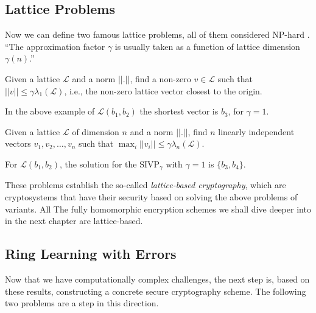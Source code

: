\subsection{Lattice Problems}
Now we can define two famous lattice problems, all of them considered NP-hard \cite{hardnes}. ``The approximation factor $\gamma$ is usually taken as a function of lattice dimension $\gamma(n)$.'' \cite{ppt_dm}

\begin{definition}\label{def:svp} Given a lattice $\mathcal L$ and a norm $||.||$, find a non-zero $v\in\mathcal L$ such that $||v||\leq\gamma \lambda_1(\mathcal L)$, i.e., the non-zero lattice vector closest to the origin. 
\end{definition}

In the above example of $\mathcal L (b_1,b_2)$ the shortest vector is $b_3$, for $\gamma=1$.

\begin{definition} Given a lattice $\mathcal L$ of dimension $n$ and a norm $||.||$, find $n$ linearly independent vectors $v_1,v_2,\ldots,v_n$ such that $\displaystyle\max_{i}{||v_i||}\leq\gamma\lambda_n(\mathcal L)$.
\end{definition}

For $\mathcal L (b_1,b_2)$, the solution for the $\text{SIVP}_\gamma$ with $\gamma=1$ is $\{b_3,b_4\}$.

These problems establish the so-called \textit{lattice-based cryptography}, which are cryptosystems that have their security based on solving the above problems of variants. All The fully homomorphic encryption schemes we shall dive deeper into in the next chapter are lattice-based.

\subsection{Ring Learning with Errors}
Now that we have computationally complex challenges, the next step is, based on these results, constructing a concrete secure cryptography scheme. The following two problems are a step in this direction.

